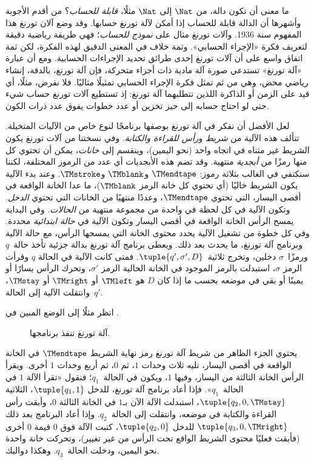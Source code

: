 \documentclass[../../../include/open-logic-section]{subfiles}
\begin{document}

ما معنى أن تكون دالة، من $\Nat$ إلى $\Nat$ مثلًا، \emph{قابلة
للحساب}؟ من أقدم الأجوبة وأشهرها أن الدالة قابلة للحساب إذا أمكن
لآلة تورنغ حسابها. وقد وضع آلان تورنغ هذا المفهوم سنة 1936. وآلات
تورنغ مثال على \emph{نموذج للحساب}؛ فهي طريقة رياضية دقيقة لتعريف
فكرة «الإجراء الحسابي». وثمة خلاف في المعنى الدقيق لهذه الفكرة، لكن
ثمة اتفاق واسع على أن آلات تورنغ إحدى طرائق تحديد الإجراءات
الحسابية. ومع أن عبارة «آلة تورنغ» تستدعي صورة آلة مادية ذات أجزاء
متحركة، فإن آلة تورنغ، بالدقة، إنشاء رياضي محض، وهي من ثم تمثل فكرة
الإجراء الحسابي تمثيلًا مثاليًا. فلا نفرض، مثلًا، أي قيد على الزمن أو
الذاكرة اللذين تتطلبهما آلة تورنغ: إذ تستطيع آلات تورنغ حساب شيء حتى
لو احتاج حسابه إلى حيز تخزين أو عدد خطوات يفوق عدد ذرات الكون.

\begin{explain}
لعل الأفضل أن نفكر في آلة تورنغ بوصفها برنامجًا لنوع خاص من الآليات
المتخيلة. تتألف هذه الآلية من \emph{شريط} و\emph{رأس للقراءة
والكتابة}. وفي نسختنا من آلات تورنغ يكون الشريط غير متناه في اتجاه
واحد (نحو اليمين)، وينقسم إلى \emph{خانات}، يمكن أن تحتوي كل منها
رمزًا من \emph{أبجدية} منتهية. وقد تضم هذه الأبجديات أي عدد من الرموز
المختلفة، لكننا سنكتفي في الغالب بثلاثة رموز:
$\TMendtape$ و$\TMblank$ و$\TMstroke$. وعند بدء الآلية يكون الشريط
خاليًا (أي تحتوي كل خانة الرمز $\TMblank$)، ما عدا الخانة الواقعة في
أقصى اليسار، التي تحتوي $\TMendtape$، وعددًا منتهيًا من الخانات التي
تحتوي \emph{الدخل}. وتكون الآلية في كل لحظة في واحدة من مجموعة
منتهية من \emph{الحالات}. وفي البداية يمسح الرأس الخانة الواقعة في
أقصى اليسار وتكون الآلية في \emph{حالة ابتدائية} محددة. وفي كل خطوة
من تشغيل الآلية يحدد محتوى الخانة التي يمسحها الرأس، مع حالة الآلية
وبرنامج آلة تورنغ، ما يحدث بعد ذلك. ويعطى برنامج آلة تورنغ بدالة
جزئية تأخذ حالة~$q$ ورمزًا~$\sigma$ دخلين، وتخرج ثلاثية~$\tuple{q',
  \sigma',D}$. فمتى كانت الآلية في الحالة $q$ وقرأت الرمز $\sigma$،
استبدلت بالرمز الموجود في الخانة الحالية الرمز $\sigma'$، وتحرك الرأس
يسارًا أو يمينًا أو بقي في موضعه بحسب ما إذا كان $D$ هو $\TMleft$ أو
$\TMright$ أو $\TMstay$، وانتقلت الآلية إلى الحالة~$q'$.

انظر مثلًا إلى الوضع المبين في .
\begin{figure}
  \caption{آلة تورنغ تنفذ برنامجها.}
\end{figure}
يحتوي الجزء الظاهر من شريط آلة تورنغ رمز نهاية الشريط $\TMendtape$
في الخانة الواقعة في أقصى اليسار، تليه ثلاث وحدات $1$، ثم $0$، ثم
أربع وحدات $1$ أخرى. ويقرأ الرأس الخانة الثالثة من اليسار، وفيها
$1$، ويكون في الحالة~$q_1$؛ فنقول «تقرأ الآلة $1$ في الحالة~$q_1$».
فإذا أعاد برنامج آلة تورنغ، للدخل $\tuple{q_1,1}$، الثلاثية
$\tuple{q_2,0,\TMstay}$، استبدلت الآلة الآن بـ$1$ في الخانة الثالثة
$0$، وأبقت رأس القراءة والكتابة في موضعه، وانتقلت إلى الحالة~$q_2$.
وإذا أعاد البرنامج بعد ذلك $\tuple{q_3,0,\TMright}$ للدخل
$\tuple{q_2,0}$، كتبت الآلة فوق $0$ قيمة $0$ أخرى (فأبقت فعليًا
محتوى الشريط الواقع تحت الرأس من غير تغيير)، وتحركت خانة واحدة نحو
اليمين، ودخلت الحالة~$q_3$. وهكذا دواليك.


\end{explain}
\end{document}
